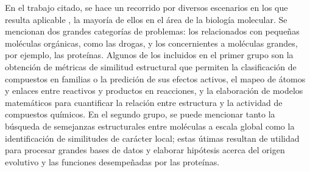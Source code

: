 En el trabajo citado, se hace un recorrido por diversos escenarios en los que
resulta aplicable , la mayoría de ellos en el área de la biología
molecular. Se mencionan dos grandes categorías de problemas: los relacionados
con pequeñas moléculas orgánicas, como las drogas, y los concernientes a
moléculas grandes, por ejemplo, las proteínas. Algunos de los incluidos en el
primer grupo son la obtención de métricas de similitud estructural que
permiten la clasificación de compuestos en familias o la predición de sus
efectos activos, el mapeo de átomos y enlaces entre reactivos y productos en
reacciones, y la elaboración de modelos matemáticos para cuantificar
la relación entre estructura y la actividad de compuestos químicos. En el
segundo grupo, se puede mencionar tanto la búsqueda de semejanzas
estructurales entre moléculas a escala global como la identificación de
similitudes de carácter local; estas útimas resultan de utilidad para procesar
grandes bases de datos y elaborar hipótesis acerca del origen evolutivo y las
funciones desempeñadas por las proteínas.
